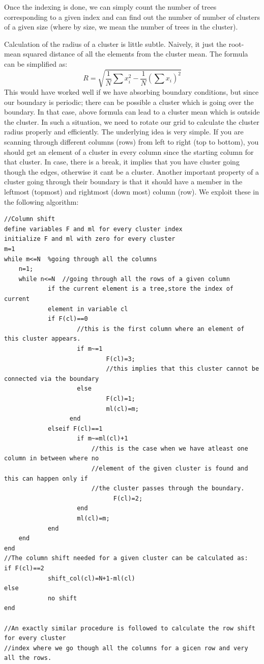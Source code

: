 \documentclass[11pt]{article}
\def \beq{\begin{equation}}
\def \eeq{\end{equation}}
\def \beq{\begin{equation}}
\def \eeq{\end{equation}}
\begin{document}
Once the indexing is done, we can simply count the number of trees corresponding to a given index and can find out the number of number of clusters of a given size (where by size, we mean the number of trees in the cluster).

Calculation of the radius of a cluster is little subtle. Naively, it just the root-mean squared distance of all the elements from the cluster mean. The formula can be simplified as:
\beq
R=\sqrt{\frac{1}{N}\sum{x_{i}^{2}}-\frac{1}{N}(\sum{x_{i}})^2}
\eeq  
This would have worked well if we have absorbing boundary conditions, but since our boundary is periodic; there can be possible a cluster which is going over the boundary. In that case, above formula can lead to a cluster mean which is outside the cluster. In such a situation, we need to rotate our grid to calculate the cluster radius properly and efficiently. The underlying idea is very simple. If you are scanning through different columns (rows) from left to right (top to bottom), you should get an element of a cluster in every column since the starting column for that cluster. In case, there is a break, it implies that you have cluster going though the edges, otherwise it cant be a cluster. Another important property of a cluster going through their boundary is that it should have a member in the leftmost (topmost) and rightmost (down most) column (row). We exploit these in the following algorithm:\\

\begin{verbatim}
//Column shift
define variables F and ml for every cluster index
initialize F and ml with zero for every cluster
m=1
while m<=N  %going through all the columns
	n=1;
	while n<=N  //going through all the rows of a given column
			if the current element is a tree,store the index of current 
			element in variable cl
			if F(cl)==0
					//this is the first column where an element of this cluster appears.
					if m~=1
							F(cl)=3;
							//this implies that this cluster cannot be connected via the boundary
					else
							F(cl)=1;
							ml(cl)=m;
				  end
			elseif F(cl)==1
					if m~=ml(cl)+1
						//this is the case when we have atleast one column in between where no
						//element of the given cluster is found and this can happen only if
						//the cluster passes through the boundary.
							  F(cl)=2;
					end		  
					ml(cl)=m;
			end
	end
end			
//The column shift needed for a given cluster can be calculated as:
if F(cl)==2
			shift_col(cl)=N+1-ml(cl)
else
			no shift
end									  

//An exactly similar procedure is followed to calculate the row shift for every cluster 
//index where we go though all the columns for a gicen row and very all the rows.

\end{verbatim}
\end{document}
